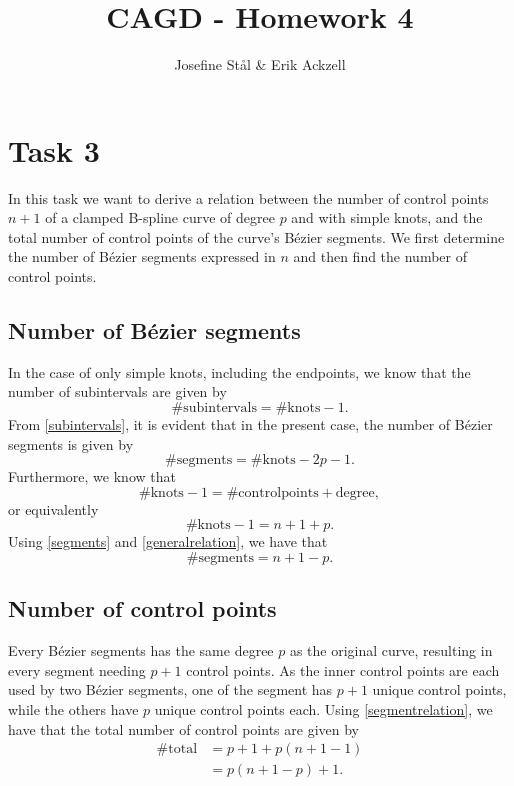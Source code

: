 \documentclass[]{article}
\title{CAGD - Homework 4}
\author{Josefine St{\aa}l \& Erik Ackzell}
\begin{document}
\maketitle

\section*{Task 3}
In this task we want to derive a relation between the number of control points $n+1$ of a clamped B-spline curve of degree $p$ and with simple knots, and the total number of control points of the curve's B\'{e}zier segments. We first determine the number of B\'{e}zier segments expressed in $n$ and then find the number of control points.
\subsection*{Number of B\'{e}zier segments}
In the case of only simple knots, including the endpoints, we know that the number of subintervals are given by \begin{equation}\label{subintervals}
\#\mathrm{subintervals} = \#\mathrm{knots} - 1.
\end{equation}
From \eqref{subintervals}, it is evident that in the present case, the number of B\'{e}zier segments is given by \begin{equation}\label{segments}
\#\mathrm{segments} = \#\mathrm{knots} - 2p - 1.
\end{equation}
Furthermore, we know that \begin{equation*}
\#\mathrm{knots} - 1 = \#\mathrm{controlpoints} + \mathrm{degree},
\end{equation*} 
or equivalently\begin{equation}\label{generalrelation}
\#\mathrm{knots} - 1 = n + 1 + p.
\end{equation}
Using \eqref{segments} and \eqref{generalrelation}, we have that \begin{equation}\label{segmentrelation}
\#\mathrm{segments} = n + 1 - p.
\end{equation}
\subsection*{Number of control points}
Every B\'{e}zier segments has the same degree $p$ as the original curve, resulting in every segment needing $p+1$ control points. As the inner control points are each used by two B\'{e}zier segments, one of the segment has $p+1$ unique control points, while the others have $p$ unique control points each. Using \eqref{segmentrelation}, we have that the total number of control points are given by\begin{equation*}
\begin{aligned}
\#\mathrm{total} &= p + 1 + p(n + 1 - 1)\\
&= p(n + 1 - p) + 1.
\end{aligned}
\end{equation*}
\end{document}
